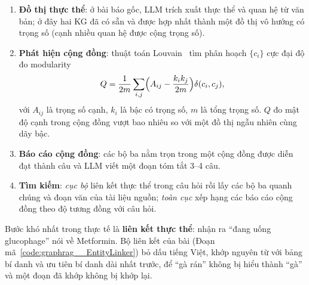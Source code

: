 \begin{enumerate}
  \item \textbf{Đồ thị thực thể}: ở bài báo gốc, LLM trích xuất thực thể và quan hệ từ văn bản; ở đây hai KG đã có
        sẵn và được hợp nhất thành một đồ thị vô hướng có trọng số (cạnh nhiều quan hệ được cộng trọng số).
  \item \textbf{Phát hiện cộng đồng}: thuật toán Louvain~\cite{blondel2008louvain} tìm phân hoạch $\{c_i\}$ cực đại
        độ đo modularity
        \begin{equation}
          Q = \frac{1}{2m}\sum_{i,j}\Bigl(A_{ij} - \frac{k_i k_j}{2m}\Bigr)\delta(c_i, c_j),
        \end{equation}
        với $A_{ij}$ là trọng số cạnh, $k_i$ là bậc có trọng số, $m$ là tổng trọng số. $Q$ đo mật độ cạnh trong cộng
        đồng vượt bao nhiêu so với một đồ thị ngẫu nhiên cùng dãy bậc.
  \item \textbf{Báo cáo cộng đồng}: các bộ ba nằm trọn trong một cộng đồng được diễn đạt thành câu và LLM viết một
        đoạn tóm tắt 3--4 câu.
  \item \textbf{Tìm kiếm}: \emph{cục bộ} liên kết thực thể trong câu hỏi rồi lấy các bộ ba quanh chúng và đoạn
        văn của tài liệu nguồn; \emph{toàn cục} xếp hạng các báo cáo cộng đồng theo độ tương đồng với câu hỏi.
\end{enumerate}


Bước khó nhất trong thực tế là \textbf{liên kết thực thể}: nhận ra ``đang uống glucophage'' nói về
\textsf{Metformin}. Bộ liên kết của bài (Đoạn mã~\ref{code:graphrag__EntityLinker}) bỏ dấu tiếng Việt, khớp nguyên
từ với bảng bí danh và ưu tiên bí danh dài nhất trước, để ``gà rán'' không bị hiểu thành ``gà'' và một đoạn đã
khớp không bị khớp lại.


